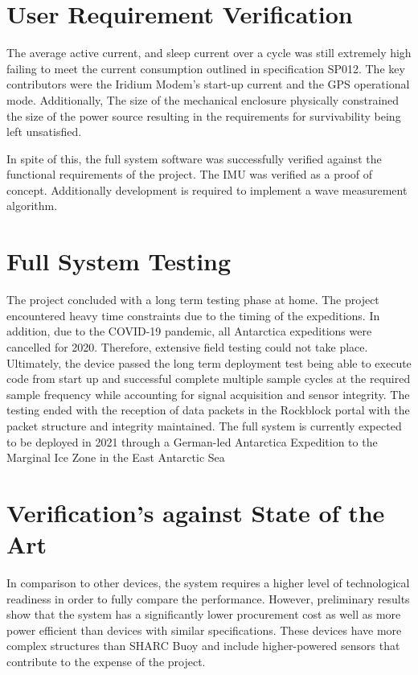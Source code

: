 \section{User Requirement Verification}
The average active current, and sleep current over a cycle was still extremely high failing to meet the current consumption outlined in specification SP012. The key contributors were the Iridium Modem's start-up current and the GPS operational mode. Additionally, The size of the mechanical enclosure physically constrained the size of the power source resulting in the requirements for survivability being left unsatisfied.\par 

In spite of this, the full system software was successfully verified against the functional requirements of the project. The IMU was verified as a proof of concept. Additionally development is required to implement  a wave measurement algorithm.

\section{Full System Testing}

The project concluded with a long term testing phase at home. The project encountered heavy time constraints due to the timing of the expeditions. In addition, due to the COVID-19 pandemic, all Antarctica expeditions were cancelled for 2020. Therefore, extensive field testing could not take place. Ultimately, the device passed the long term deployment test being able to execute code from start up and successful complete multiple sample cycles at the required sample frequency while accounting for signal acquisition and sensor integrity. The testing ended with the reception of data packets in the Rockblock portal with the packet structure and integrity maintained. The full system is currently expected to be deployed in 2021 through a German-led Antarctica Expedition to the Marginal Ice Zone in the East Antarctic Sea

\section{Verification's against State of the Art}

In comparison to other devices, the system requires a higher level of technological readiness in order to fully compare the performance. However, preliminary results show that the system has a significantly lower procurement cost as well as more power efficient than devices with similar specifications. These devices have more complex structures than SHARC Buoy and include higher-powered sensors that contribute to the expense of the project.


